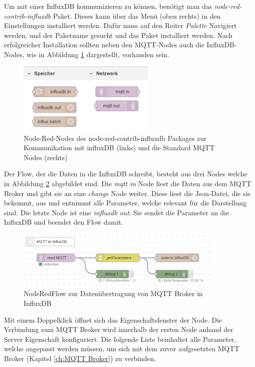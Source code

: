 \documentclass[a4paper, 12pt, oneside, toc=listofnumbered, bibliography=totoc]{scrbook}
\begin{document}
			Um mit einer InfluxDB kommunizieren zu können, benötigt man das \textit{node-red-contrib-influxdb} Paket. Dieses kann über das Menü (oben rechts) in den Einstellungen installiert werden. Dafür muss auf den Reiter \textit{Palette} Navigiert werden, und der Paketname gesucht und das Paket installiert werden. Nach erfolgreicher Installation sollten neben den MQTT-Nodes auch die InfluxDB-Nodes, wie in Abbildung \ref{fig:nodes} dargestellt, vorhanden sein.
			
			\begin{figure}[H]
				\centering
				\includegraphics[width=0.6\textwidth]{res/NodeRedNodes.png}
				\caption{Node-Red-Nodes des node-red-contrib-influxdb Packages zur Kommunikation mit influxDB (links) und die Standard MQTT Nodes (rechts)}
				\label{fig:nodes}
			\end{figure}
		
			Der Flow, der die Daten in die InfluxDB schreibt, besteht aus drei Nodes welche in Abbildung \ref{fig:flow} abgebildet sind. Die \textit{mqtt in} Node liest die Daten aus dem MQTT Broker und gibt sie an eine \textit{change} Node weiter. Diese liest die Json-Datei, die sie bekommt, aus und entnimmt alle Parameter, welche relevant für die Darstellung sind. Die letzte Node ist eine \textit{influxdb out}. Sie sendet die Parameter an die InfluxDB und beendet den Flow damit. 
			
			\begin{figure}[H]
				\centering
				\includegraphics[width=0.9\textwidth]{res/NodeRedFlow.png}
				\caption{NodeRedFlow zur Datenübertragung von MQTT Broker in InfluxDB}
				\label{fig:flow}
			\end{figure}
			
			Mit einem Doppelklick öffnet sich das Eigenschaftsfenster der Node. Die Verbindung zum MQTT Broker wird innerhalb der ersten Node anhand der Server Eigenschaft konfiguriert. Die folgende Liste beinhaltet alle Parameter, welche angepasst werden müssen, um sich mit dem zuvor aufgesetzten MQTT Broker (Kapitel \ref{ch:MQTT Broker}) zu verbinden.
			
\end{document}
